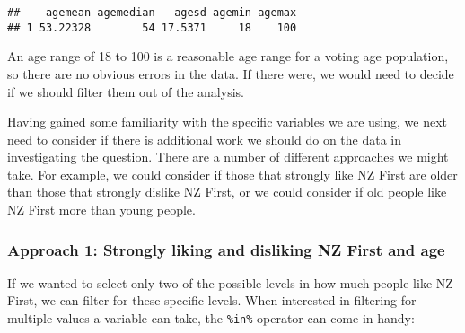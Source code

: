 \documentclass[]{article}
\newenvironment{Shaded}{\begin{snugshade}}{\end{snugshade}}
\newcommand{\KeywordTok}[1]{\textcolor[rgb]{0.13,0.29,0.53}{\textbf{#1}}}
\newcommand{\DataTypeTok}[1]{\textcolor[rgb]{0.13,0.29,0.53}{#1}}
\newcommand{\StringTok}[1]{\textcolor[rgb]{0.31,0.60,0.02}{#1}}
\newcommand{\OperatorTok}[1]{\textcolor[rgb]{0.81,0.36,0.00}{\textbf{#1}}}
\newcommand{\NormalTok}[1]{#1}
\begin{document}
\begin{Shaded}
\end{Shaded}

\begin{verbatim}
##    agemean agemedian   agesd agemin agemax
## 1 53.22328        54 17.5371     18    100
\end{verbatim}

An age range of 18 to 100 is a reasonable age range for a voting age
population, so there are no obvious errors in the data. If there were,
we would need to decide if we should filter them out of the analysis.

Having gained some familiarity with the specific variables we are using,
we next need to consider if there is additional work we should do on the
data in investigating the question. There are a number of different
approaches we might take. For example, we could consider if those that
strongly like NZ First are older than those that strongly dislike NZ
First, or we could consider if old people like NZ First more than young
people.

\subsubsection{Approach 1: Strongly liking and disliking NZ First and
age}\label{approach-1-strongly-liking-and-disliking-nz-first-and-age}

If we wanted to select only two of the possible levels in how much
people like NZ First, we can filter for these specific levels. When
interested in filtering for multiple values a variable can take, the
\texttt{\%in\%} operator can come in handy:

\begin{Shaded}
\end{Shaded}
\end{document}
